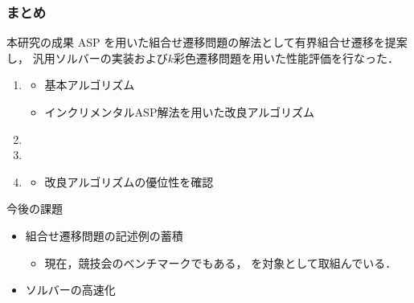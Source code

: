\documentclass[dvipdfmx,11pt]{beamer}
\begin{document}
\begin{frame}\frametitle{まとめ}

  \begin{alertblock}{本研究の成果}\centering
    ASP を用いた組合せ遷移問題の解法として有界組合せ遷移を提案し，
    汎用ソルバーの実装および$k$彩色遷移問題を用いた性能評価を行なった．
  \end{alertblock}

  \begin{enumerate}
  \item {}
    \begin{itemize}
    \item 基本アルゴリズム
    \item インクリメンタルASP解法を用いた改良アルゴリズム
    \end{itemize}
  \item {}
  \item {}
  \item {}
    \begin{itemize}
    \item 改良アルゴリズムの優位性を確認
    \end{itemize}
  \end{enumerate}
  
  \begin{exampleblock}{今後の課題}
    \begin{itemize}
      \item 組合せ遷移問題の記述例の蓄積
        \begin{itemize}
          \item 現在，競技会のベンチマークでもある，
            を対象として取組んでいる．
        \end{itemize}
      \item ソルバーの高速化
    \end{itemize}
  \end{exampleblock}
\end{frame}

\end{document}
